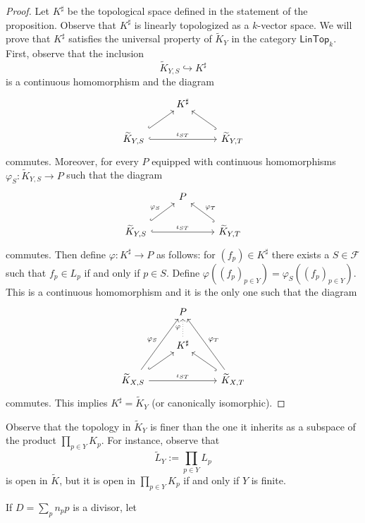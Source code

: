\begin{proof}
	Let $K^{\sharp}$ be the topological space defined in the statement of the proposition. Observe that $K^{\sharp}$ is linearly topologized as a $k$-vector space. We will prove that $K^{\sharp}$ satisfies the universal property of $\widetilde{K}_{Y}$ in the category $\mathsf{LinTop}_{k}$. First, observe that the inclusion
	\[
		\widetilde{K}_{Y,S} \hookrightarrow K^{\sharp}
	\]
	is a continuous homomorphism and the diagram
	\[
		\begin{tikzcd}
			& K^{\sharp} & \\
			\widetilde{K}_{Y,S} \arrow[rr, "\iota_{ST}", hook]\arrow[ur, hook] & & \widetilde{K}_{Y,T} \arrow[lu, hook]
		\end{tikzcd}
	\]
	commutes. Moreover, for every $P$ equipped with continuous homomorphisms $\varphi_{S}\colon \widetilde{K}_{Y,S}\to P$ such that the diagram 
	\[
		\begin{tikzcd}
			& P & \\
			\widetilde{K}_{Y,S} \arrow[rr, "\iota_{ST}", hook]\arrow[ur, hook, "\varphi_{S}"] & & \widetilde{K}_{Y,T} \arrow[lu, hook, "\varphi_{T}", swap]
		\end{tikzcd}
	\]
	commutes. Then define $\varphi\colon K^{\sharp} \to P$ as follows: for $(f_{p}) \in K^{\sharp}$ there exists a $S\in \mathscr{F}$ such that $f_{p} \in L_{p}$ if and only if $p \in S$. Define $\varphi( (f_{p})_{p\in Y} ) = \varphi_{S}( (f_{p})_{p\in Y} )$. This is a continuous homomorphism and it is the only one such that the diagram
	\[
		\begin{tikzcd}
			& P & \\
			& K^{\sharp} \arrow[u, "\varphi", dotted] & \\
			\widetilde{K}_{X,S} \arrow[rr, "\iota_{ST}"]\arrow[uur, "\varphi_{S}"]\arrow[ur, hook] & & \widetilde{K}_{X,T} \arrow[luu, "\varphi_{T}", swap] \arrow[lu, hook]
		\end{tikzcd}
	\]
	commutes. This implies $K^{\sharp} = \widetilde{K}_{Y}$ (or canonically isomorphic).
\end{proof}
\begin{remark}\label{rem:adèle-not-subspace-topology}
	Observe that the topology in $\widetilde{K}_{Y}$ is finer than the one it inherits as a subspace of the product $\prod_{p\in Y}K_{p}$. For instance, observe that 
	\[
		\widetilde{L}_{Y} := \prod_{p\in Y}L_{p} 
	\] 
	is open in $\widetilde{K}$, but it is open in $\prod_{p\in Y} K_{p}$ if and only if $Y$ is finite. 
\end{remark}
If $D = \sum_{p}n_{p}p$ is a divisor, let
